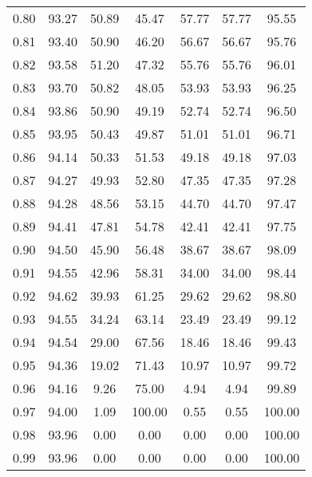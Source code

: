 \begin{tabular}{|c|c|c|c|c|c|c|}
      0.80 &     93.27 &     50.89 &      45.47 &   57.77 &      57.77 &         95.55 \\
      0.81 &     93.40 &     50.90 &      46.20 &   56.67 &      56.67 &         95.76 \\
      0.82 &     93.58 &     51.20 &      47.32 &   55.76 &      55.76 &         96.01 \\
      0.83 &     93.70 &     50.82 &      48.05 &   53.93 &      53.93 &         96.25 \\
      0.84 &     93.86 &     50.90 &      49.19 &   52.74 &      52.74 &         96.50 \\
      0.85 &     93.95 &     50.43 &      49.87 &   51.01 &      51.01 &         96.71 \\
      0.86 &     94.14 &     50.33 &      51.53 &   49.18 &      49.18 &         97.03 \\
      0.87 &     94.27 &     49.93 &      52.80 &   47.35 &      47.35 &         97.28 \\
      0.88 &     94.28 &     48.56 &      53.15 &   44.70 &      44.70 &         97.47 \\
      0.89 &     94.41 &     47.81 &      54.78 &   42.41 &      42.41 &         97.75 \\
      0.90 &     94.50 &     45.90 &      56.48 &   38.67 &      38.67 &         98.09 \\
      0.91 &     94.55 &     42.96 &      58.31 &   34.00 &      34.00 &         98.44 \\
      0.92 &     94.62 &     39.93 &      61.25 &   29.62 &      29.62 &         98.80 \\
      0.93 &     94.55 &     34.24 &      63.14 &   23.49 &      23.49 &         99.12 \\
      0.94 &     94.54 &     29.00 &      67.56 &   18.46 &      18.46 &         99.43 \\
      0.95 &     94.36 &     19.02 &      71.43 &   10.97 &      10.97 &         99.72 \\
      0.96 &     94.16 &      9.26 &      75.00 &    4.94 &       4.94 &         99.89 \\
      0.97 &     94.00 &      1.09 &     100.00 &    0.55 &       0.55 &        100.00 \\
      0.98 &     93.96 &      0.00 &       0.00 &    0.00 &       0.00 &        100.00 \\
      0.99 &     93.96 &      0.00 &       0.00 &    0.00 &       0.00 &        100.00 \\
\bottomrule
\end{tabular}
